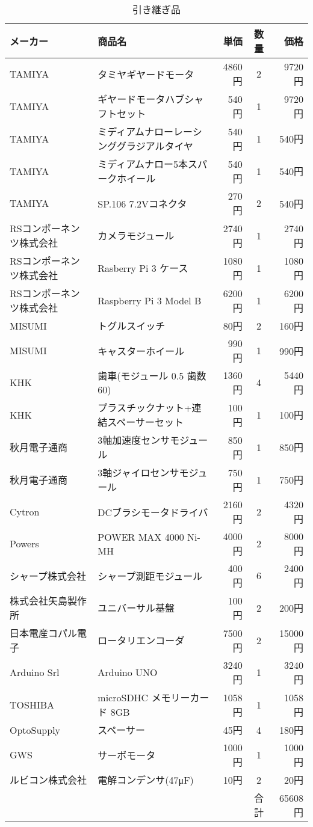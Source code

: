 \begin{table}[H]
 \begin{center}
  \caption{引き継ぎ品}
  \label{tab:list1}
  \begin{tabular}{|l|l|r|c|r|}  \hline
   メーカー & 商品名 & 単価 & 数量 & 価格 \\ \hline \hline 
   TAMIYA & タミヤギヤードモータ & 4860円 & 2 & 9720円  \\     \hline
   TAMIYA & ギヤードモータハブシャフトセット & 540円 & 1 & 9720円   \\  \hline
   TAMIYA & ミディアムナローレーシンググラジアルタイヤ & 540円 & 1 & 540円  \\  \hline
   TAMIYA & ミディアムナロー5本スパークホイール & 540円 & 1 & 540円   \\     \hline
   TAMIYA & SP.106 7.2Vコネクタ & 270円 & 2 & 540円  \\      \hline
   RSコンポーネンツ株式会社 & カメラモジュール &  2740円 & 1 & 2740円  \\ \hline
   RSコンポーネンツ株式会社 & Rasberry Pi 3 ケース & 1080円 & 1 & 1080円  \\    \hline
   RSコンポーネンツ株式会社 & Raspberry Pi 3 Model B & 6200円 & 1 & 6200円  \\     \hline
   MISUMI & トグルスイッチ & 80円 & 2 & 160円 \\       \hline
   MISUMI & キャスターホイール & 990円 & 1 & 990円 \\     \hline
   KHK & 歯車(モジュール 0.5 歯数60) &1360円 & 4 & 5440円 \\      \hline
   KHK & プラスチックナット+連結スペーサーセット & 100円 & 1 & 100円  \\      \hline
   秋月電子通商 & 3軸加速度センサモジュール & 850円 & 1 & 850円  \\     \hline
   秋月電子通商 & 3軸ジャイロセンサモジュール & 750円  & 1 & 750円 \\     \hline
   Cytron &DCブラシモータドライバ & 2160円 & 2 & 4320円 \\       \hline
   Powers & POWER MAX 4000 Ni-MH& 4000円 & 2 & 8000円  \\     \hline
   シャープ株式会社 & シャープ測距モジュール & 400円 & 6 & 2400円  \\    \hline
   株式会社矢島製作所 & ユニバーサル基盤 & 100円 & 2 & 200円 \\    \hline
   日本電産コパル電子 & ロータリエンコーダ & 7500円 & 2 & 15000円  \\   \hline
   Arduino Srl & Arduino UNO & 3240円 & 1 & 3240円  \\     \hline
   TOSHIBA & microSDHC メモリーカード 8GB & 1058円 & 1 & 1058円  \\    \hline
   OptoSupply & スペーサー & 45円 & 4 & 180円  \\     \hline
   GWS &サーボモータ & 1000円 & 1 & 1000円  \\    \hline
   ルビコン株式会社 & 電解コンデンサ(47μF) & 10円 & 2 &20円 \\     \hline
   &  & &合計 & 65608円  \\   \hline
  \end{tabular}
 \end{center}
\end{table}

